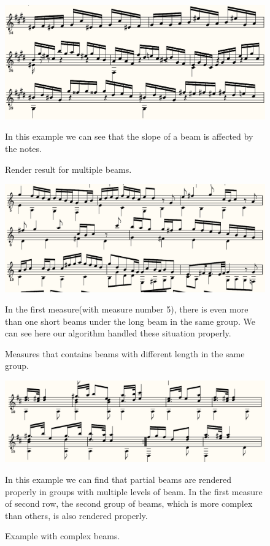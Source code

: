 \begin{figure}[h]
    \centering
    \includegraphics[scale=\renderscale]{Figures/render-Allegro-by-Bernardo-Palma-V.png}
    \caption{Render result for multiple beams.}
    \label{fig:render-multiple-beam}
    \startdescription
    In this example we can see that the slope of a beam is affected by the notes.
\end{figure}


\begin{figure}[h]
    \centering
    \includegraphics[scale=\renderscale]{Figures/render-BWV-645-C.png}
    \caption{Measures that contains beams with different length in the same group.}
    \label{fig:render-beam-vary-length}
    \startdescription
    In the first measure(with measure number 5), there is even more than one short beams under the long beam in the same group. We can see here our algorithm handled these situation properly.
\end{figure}

\begin{figure}[h]
    \centering
    \includegraphics[scale=\renderscale]{../Figures/render-Fernando-Sor-Op-32-Mazurka.png}
    \caption{Example with complex beams.}
    \label{fig:render-complex-beams}
    \startdescription
    In this example we can find that partial beams are rendered properly in groups with multiple levels of beam. In the first measure of second row, the second group of beams, which is more complex than others, is also rendered properly.
\end{figure}

